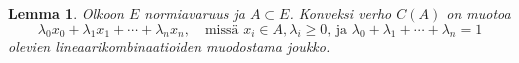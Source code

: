 \documentclass[12pt,a4paper,leqno]{report}
\theoremstyle{plain}
\newtheorem{lem}[equation]{Lemma}
\theoremstyle{definition}
\theoremstyle{remark}
\begin{document}
\begin{lem} Olkoon $E$ normiavaruus ja $A\subset E$. 
Konveksi verho $C(A)$ on muotoa 
$$\lambda_0 x_0+\lambda_1 x_1+\cdots+\lambda_{n} x_{n},\quad\text{missä } x_i\in A, \lambda_i\geq0\text{, ja }\lambda_0+\lambda_1+\cdots+ \lambda_{n} =1$$ 
olevien lineaarikombinaatioiden muodostama joukko.
\end{lem}
\end{document}
